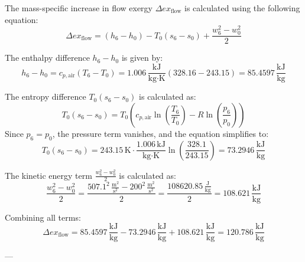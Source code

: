 The mass-specific increase in flow exergy \( \Delta ex_{\text{flow}} \) is calculated using the following equation:  
\[
\Delta ex_{\text{flow}} = (h_6 - h_0) - T_0 (s_6 - s_0) + \frac{w_6^2 - w_0^2}{2}
\]

The enthalpy difference \( h_6 - h_0 \) is given by:  
\[
h_6 - h_0 = c_{p,\text{air}} (T_6 - T_0) = 1.006 \, \frac{\text{kJ}}{\text{kg·K}} (328.16 - 243.15) = 85.4597 \, \frac{\text{kJ}}{\text{kg}}
\]

The entropy difference \( T_0 (s_6 - s_0) \) is calculated as:  
\[
T_0 (s_6 - s_0) = T_0 \left( c_{p,\text{air}} \ln \left( \frac{T_6}{T_0} \right) - R \ln \left( \frac{p_6}{p_0} \right) \right)
\]
Since \( p_6 = p_0 \), the pressure term vanishes, and the equation simplifies to:  
\[
T_0 (s_6 - s_0) = 243.15 \, \text{K} \cdot \frac{1.006 \, \text{kJ}}{\text{kg·K}} \ln \left( \frac{328.1}{243.15} \right) = 73.2946 \, \frac{\text{kJ}}{\text{kg}}
\]

The kinetic energy term \( \frac{w_6^2 - w_0^2}{2} \) is calculated as:  
\[
\frac{w_6^2 - w_0^2}{2} = \frac{507.1^2 \, \frac{\text{m}^2}{\text{s}^2} - 200^2 \, \frac{\text{m}^2}{\text{s}^2}}{2} = \frac{108620.85 \, \frac{\text{J}}{\text{kg}}}{2} = 108.621 \, \frac{\text{kJ}}{\text{kg}}
\]

Combining all terms:  
\[
\Delta ex_{\text{flow}} = 85.4597 \, \frac{\text{kJ}}{\text{kg}} - 73.2946 \, \frac{\text{kJ}}{\text{kg}} + 108.621 \, \frac{\text{kJ}}{\text{kg}} = 120.786 \, \frac{\text{kJ}}{\text{kg}}
\]

---